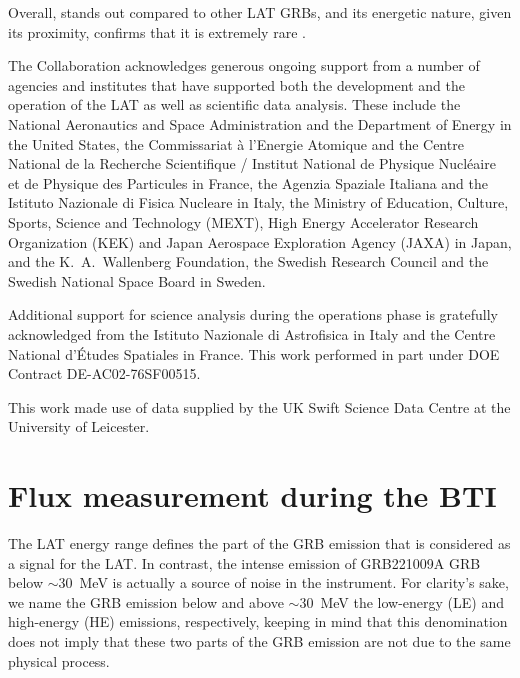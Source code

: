 \documentclass[preprint]{aastex631}
\begin{document}
Overall, \grb stands out compared to other LAT GRBs, and its energetic nature, given its proximity, confirms that it is extremely rare \citep{BOAT}.
%
%
\begin{acknowledgments}

The {\lat} Collaboration acknowledges generous ongoing support from a number of agencies and institutes that have supported both the
development and the operation of the LAT as well as scientific data analysis.
These include the National Aeronautics and Space Administration and the
Department of Energy in the United States, the Commissariat \`a l'Energie Atomique and the Centre National de la Recherche Scientifique / Institut National de Physique Nucl\'eaire et de Physique des Particules in France, the Agenzia Spaziale Italiana and the Istituto Nazionale di Fisica Nucleare in Italy, the Ministry of Education, Culture, Sports, Science and Technology (MEXT), High Energy Accelerator Research Organization (KEK) and Japan Aerospace Exploration Agency (JAXA) in Japan, and the K.~A.~Wallenberg Foundation, the Swedish Research Council and the Swedish National Space Board in Sweden.

Additional support for science analysis during the operations phase is gratefully acknowledged from the Istituto Nazionale di Astrofisica in Italy and the Centre National d'\'Etudes Spatiales in France. This work performed in part under DOE Contract DE-AC02-76SF00515.


This work made use of data supplied by the UK Swift Science Data Centre at the University of Leicester.
\end{acknowledgments}
%

\clearpage

\appendix

\section{Flux measurement during the BTI}
\label{sec:BTI}
The LAT energy range defines the part of the GRB emission that is considered as a signal for the LAT. In contrast, the intense emission of GRB221009A GRB below $\sim$30~MeV is actually a source of noise in the instrument. For clarity's sake, we name the GRB emission below and above $\sim$30~MeV the low-energy (LE) and high-energy (HE) emissions, respectively, keeping in mind that this denomination does not imply that these two parts of the GRB emission are not due to the same physical process.
\end{document}
